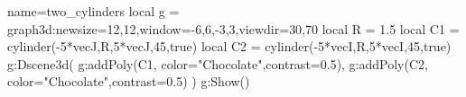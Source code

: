 \documentclass[12pt]{standalone}%
\begin{document}
\begin{luadraw}{name=two_cylinders}
local g = graph3d:new{size={12,12},window={-6,6,-3,3},viewdir={30,70}}
local R = 1.5
local C1 = cylinder(-5*vecJ,R,5*vecJ,45,true)
local C2 = cylinder(-5*vecI,R,5*vecI,45,true)
g:Dscene3d(
    g:addPoly(C1, {color="Chocolate",contrast=0.5}),
    g:addPoly(C2, {color="Chocolate",contrast=0.5})
    )
g:Show()
\end{luadraw} 
\end{document}
